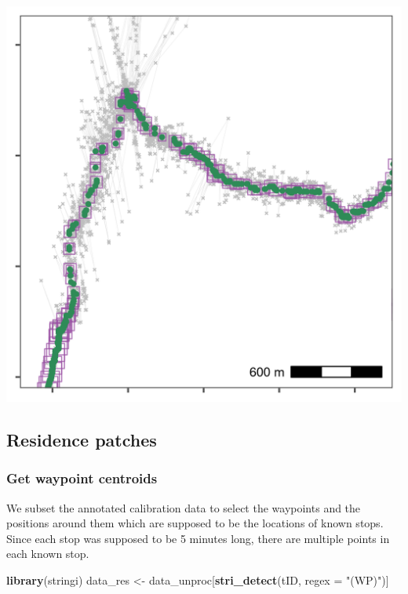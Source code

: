 \documentclass[]{scrartcl}
\newenvironment{Shaded}{}{}
\newcommand{\DataTypeTok}[1]{\textcolor[rgb]{0.56,0.13,0.00}{#1}}
\newcommand{\KeywordTok}[1]{\textcolor[rgb]{0.00,0.44,0.13}{\textbf{#1}}}
\newcommand{\NormalTok}[1]{#1}
\newcommand{\StringTok}[1]{\textcolor[rgb]{0.25,0.44,0.63}{#1}}
\begin{document}
\includegraphics{figures/fig_calib_smooth_thin.png}

\hypertarget{residence-patches}{%
\subsection{Residence patches}\label{residence-patches}}

\hypertarget{get-waypoint-centroids}{%
\subsubsection{Get waypoint centroids}\label{get-waypoint-centroids}}

We subset the annotated calibration data to select the waypoints and the positions around them which are supposed to be the locations of known stops. Since each stop was supposed to be 5 minutes long, there are multiple points in each known stop.

\begin{Shaded}
\begin{Highlighting}[]
\KeywordTok{library}\NormalTok{(stringi)}
\NormalTok{data_res <-}\StringTok{ }\NormalTok{data_unproc[}\KeywordTok{stri_detect}\NormalTok{(tID, }\DataTypeTok{regex =} \StringTok{"(WP)"}\NormalTok{)]}
\end{Highlighting}
\end{Shaded}
\end{document}

